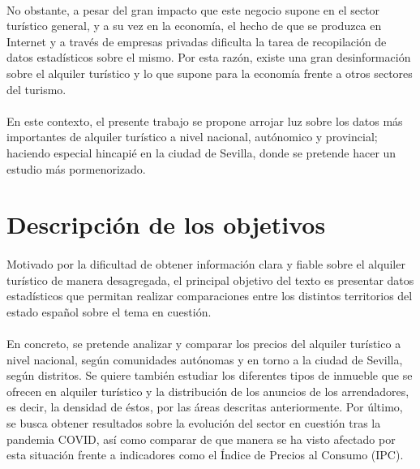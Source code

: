 \documentclass[a4paper,10pt]{article}
\begin{document}
\begin{multicols}{2}
            \paragraph*{}
            No obstante, a pesar del gran impacto que este negocio supone en el sector turístico general, y a su vez en la economía, el hecho de que se
            produzca en Internet y a través de empresas privadas dificulta la tarea de recopilación de datos estadísticos sobre el mismo. Por esta razón,
            existe una gran desinformación sobre el alquiler turístico y lo que supone para la economía frente a otros sectores del turismo.

            \paragraph*{}
            En este contexto, el presente trabajo se propone arrojar luz sobre los datos más importantes de alquiler turístico a nivel nacional, autónomico y 
            provincial; haciendo especial hincapié en la ciudad de Sevilla, donde se pretende hacer un estudio más pormenorizado. 

        \section{Descripción de los objetivos}

            \paragraph*{}
            Motivado por la dificultad de obtener información clara y fiable sobre el alquiler turístico de manera desagregada,
            el principal objetivo del texto es presentar datos estadísticos que permitan realizar comparaciones entre los distintos
            territorios del estado español sobre el tema en cuestión.
            
            \paragraph*{}
            En concreto, se pretende analizar y comparar los precios del alquiler turístico a nivel nacional, según comunidades 
            autónomas y en torno a la ciudad de Sevilla, según distritos. Se quiere también estudiar los diferentes tipos de 
            inmueble que se ofrecen en alquiler turístico y la distribución de los anuncios de los arrendadores, es decir, la densidad de éstos, por las áreas 
            descritas anteriormente. Por último, se busca obtener resultados sobre la evolución del sector en cuestión tras la pandemia COVID, así como 
            comparar de que manera se ha visto afectado por esta situación frente a indicadores como el Índice de Precios al Consumo (IPC).
       

\end{multicols}
\end{document}
